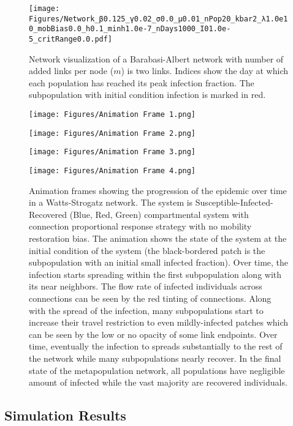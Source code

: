 \begin{figure}[!ht]
    \centering
    \texttt{[image: Figures/Network\_β0.125\_γ0.02\_σ0.0\_μ0.01\_nPop20\_kbar2\_λ1.0e10\_mobBias0.0\_h0.1\_minh1.0e-7\_nDays1000\_I01.0e-5\_critRange0.0.pdf]}
    \caption{\small Network visualization of a Barabasi-Albert network with number of added links per node ($m$) is two links. Indices show the day at which each population has reached its peak infection fraction. The subpopulation with initial condition infection is marked in red.}
    \label{}
\end{figure}

\begin{figure}[!ht]
	\centering
	\begin{minipage}[b]{0.45\textwidth}
		\texttt{[image: Figures/Animation Frame 1.png]}
	\end{minipage}
	\hfill
	\begin{minipage}[b]{0.45\textwidth}
		\texttt{[image: Figures/Animation Frame 2.png]}
	\end{minipage}
	\vfill
	\begin{minipage}[b]{0.45\textwidth}
		\texttt{[image: Figures/Animation Frame 3.png]}
	\end{minipage}
	\hfill
	\begin{minipage}[b]{0.45\textwidth}
		\texttt{[image: Figures/Animation Frame 4.png]}
	\end{minipage}
	\caption{Animation frames showing the progression of the epidemic over time in a Watts-Strogatz network. The system is Susceptible-Infected-Recovered (Blue, Red, Green) compartmental system with connection proportional response strategy with no mobility restoration bias. The animation shows the state of the system at the initial condition of the system (the black-bordered patch is the subpopulation with an initial small infected fraction). Over time, the infection starts spreading within the first subpopulation along with its near neighbors. The flow rate of infected individuals across connections can be seen by the red tinting of connections. Along with the spread of the infection, many subpopulations start to increase their travel restriction to even mildly-infected patches which can be seen by the low or no opacity of some link endpoints. Over time, eventually the infection to spreads substantially to the rest of the network while many subpopulations nearly recover. In the final state of the metapopulation network, all populations have negligible amount of infected while the vast majority are recovered individuals.}
\end{figure}

\subsection{Simulation Results}